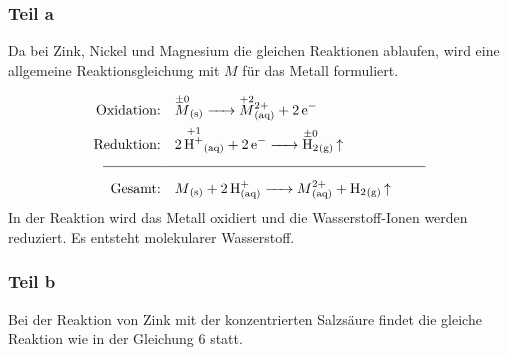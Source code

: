 \subsubsection{Teil a}
Da bei Zink, Nickel und Magnesium die gleichen Reaktionen ablaufen, wird eine
allgemeine Reaktionsgleichung mit $M$ für das Metall formuliert.

\begin{align}
    \text{Oxidation:} & \quad \ce{\overset{\pm0}{M}_{(s)} -> \overset{+2}{M}^{2+}_{(aq)} + 2e^{-}}   \\
    \text{Reduktion:} & \quad \ce{2\overset{+1}{\ce{H+}}_{(aq)} + 2e^{-} -> \overset{\pm0}{\ce{H2}}_{(g)} ^}   \\
    \rule[0.5ex]{0.12\textwidth}{0.4pt} & \rule[0.5ex]{0.55\textwidth}{0.4pt}\notag\\
    \text{Gesamt:} & \quad \ce{$M$_{(s)} + 2H^+_{(aq)} -> $M$^{2+}_{(aq)} + H2_{(g)} ^} 
\end{align}
In der Reaktion wird das Metall oxidiert und die Wasserstoff-Ionen werden reduziert. Es entsteht molekularer Wasserstoff.
\subsubsection{Teil b}
Bei der Reaktion von Zink mit der konzentrierten Salzsäure findet die gleiche
Reaktion wie in der Gleichung 6 statt.

